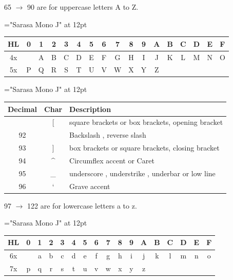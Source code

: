 65 $\rightarrow$ 90 are for uppercase letters A to Z.

{\font\rm="Sarasa Mono J" at 12pt \rm

\begin{longtable}{|c|c|c|c|c|c|c|c|c|c|c|c|c|c|c|c|c|}
\hline
HL & 0 & 1 & 2 & 3 & 4 & 5 & 6 & 7 & 8 & 9 & A & B & C & D & E & F \\
\hline
\endhead
\hline
\endfoot
\hline
\endlastfoot
4x &   & A & B & C & D & E & F & G & H & I & J & K & L & M & N & O \\
\hline
5x & P & Q & R & S & T & U & V & W & X & Y & Z &   &   &   &   &   \\
\hline

\end{longtable}

}

{\font\rm="Sarasa Mono J" at 12pt \rm

\begin{longtable}{|c|c|l|}
\hline
\textbf{Decimal} & \textbf{Char} & \textbf{Description} \\
\hline
\endhead
\hline
\endfoot
\hline
\endlastfoot
91 & [ & square brackets or box brackets, opening bracket \\
\hline
92 & \multicolumn{1}{c}{\makecell{$\backslash$}} & Backslash , reverse slash \\
\hline
93 & ] & box brackets or square brackets, closing bracket \\
\hline
94 & \textasciicircum{} & Circumflex accent or Caret \\
\hline
95 & \_ & underscore , understrike , underbar or low line \\
\hline
96 & ` & Grave accent \\
\hline

\end{longtable}

}

97 $\rightarrow$ 122 are for lowercase letters a to z.

{\font\rm="Sarasa Mono J" at 12pt \rm

\begin{longtable}{|c|c|c|c|c|c|c|c|c|c|c|c|c|c|c|c|c|}
\hline
HL & 0 & 1 & 2 & 3 & 4 & 5 & 6 & 7 & 8 & 9 & A & B & C & D & E & F \\
\hline
\endhead
\hline
\endfoot
\hline
\endlastfoot
6x &   & a & b & c & d & e & f & g & h & i & j & k & l & m & n & o \\
\hline
7x & p & q & r & s & t & u & v & w & x & y & z &   &   &   &   &   \\
\hline

\end{longtable}

}

